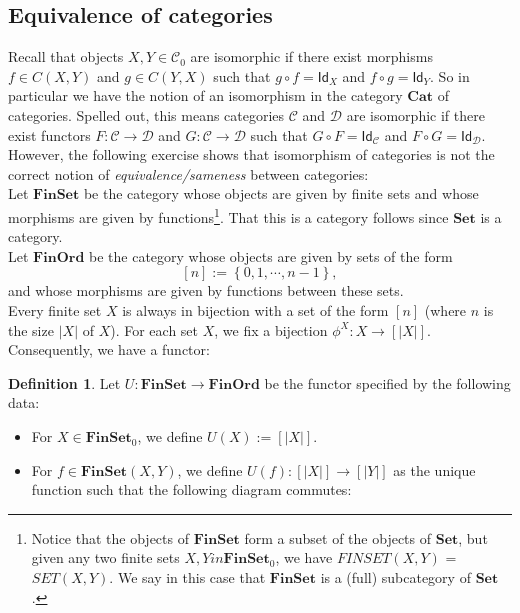 \documentclass[a4paper,10pt]{scrartcl}
\theoremstyle{plain}
\theoremstyle{definition}
\newtheorem{dfn}[thm]{Definition}
\newcommand{\cfont}[1]{\ensuremath{\mathsf{#1}}}
\newcommand{\Cat}[1]{\mathcal{#1}}
\newcommand{\CC}{\Cat{C}}
\newcommand{\DD}{\Cat{D}}
\newcommand{\Catb}[1]{\mathbf{#1}}
\newcommand{\SET}{\Catb{Set}}
\newcommand{\FINSET}{\Catb{FinSet}}
\newcommand{\CAT}{\Catb{Cat}}
\newcommand{\Ob}[1]{{#1}_0}
\newcommand{\CHom}[3]{{#1}(#2,#3)}
\newcommand{\Id}[1][]{\cfont{Id}_{#1}}
\newcommand{\co}[2]{\ensuremath{#2 \circ #1}}
\begin{document}
\subsection{Equivalence of categories}
Recall that objects $X,Y\in\Ob{\CC}$ are isomorphic if there exist morphisms $f\in\CHom{C}{X}{Y}$ and $g\in\CHom{C}{Y}{X}$ such that $\co{f}{g} = \Id[X]$ and $\co{g}{f} = \Id[Y]$. So in particular we have the notion of an isomorphism in the category $\CAT$ of categories. Spelled out, this means categories $\CC$ and $\DD$ are isomorphic if there exist functors $F:\CC\to\DD$ and $G:\CC\to\DD$ such that $\co{F}{G}= \Id[\CC]$ and $\co{G}{F} = \Id[\DD]$.\\
However, the following exercise shows that isomorphism of categories is not the correct notion of \textit{equivalence/sameness} between categories:\\
Let $\FINSET$ be the category whose objects are given by finite sets and whose morphisms are given by functions\footnote{Notice that the objects of $\FINSET$ form a subset of the objects of $\SET$, but given any two finite sets $X,Y in \Ob{\FINSET}$, we have $\CHom{FINSET}{X}{Y}$ = $\CHom{SET}{X}{Y}$. We say in this case that $\FINSET$ is a (full) subcategory of $\SET$.}. That this is a category follows since $\SET$ is a category.\\
Let $\Catb{FinOrd}$ be the category whose objects are given by sets of the form 
\[
[n] := \left\{0,1,\cdots,n-1\right\},
\]
and whose morphisms are given by functions between these sets.\\
Every finite set $X$ is always in bijection with a set of the form $[n]$ (where $n$ is the size $\vert X\vert$ of $X$). For each set $X$, we fix a bijection $\phi^X: X\to [\vert X\vert]$. Consequently, we have a functor:
\begin{dfn} Let $U: \FINSET\to \Catb{FinOrd}$ be the functor specified by the following data:
\begin{itemize}
\item For $X\in \Ob{\FINSET}$, we define $U(X) := [\vert X\vert]$.
\item For $f\in \CHom{\FINSET}{X}{Y}$, we define $U(f): [\vert X\vert]\to [\vert Y\vert]$ as the unique function such that the following diagram commutes:
\begin{center}
\end{center}
\end{itemize}
\end{dfn}
\end{document}
